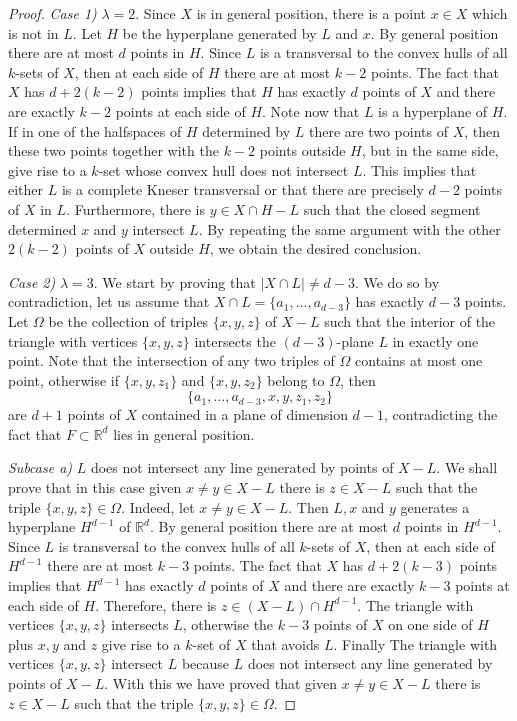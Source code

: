 \documentclass[11pt]{amsart}
\theoremstyle{plain}
\theoremstyle{definition}
\theoremstyle{remark}
\begin{document}
\begin{proof}
{\em Case 1)}  $\lambda=2$. Since $X$ is in general position, there is a point $x\in X$ which is not in $L$.  Let $H$ be the hyperplane generated by $L$ and $x$. By general position there are at most $d$ points in $H$. Since $L$ is a  transversal to the convex hulls of all $k$-sets of $X$, then at each side of $H$ there are at most $k-2$ points. The fact that $X$ has $d+2(k-2)$ points implies that $H$ has exactly $d$ points of $X$ and there are exactly $k-2$ points at each side of $H$.  Note now that $L$ is a hyperplane of $H$. If in one of the halfspaces of $H$ determined by $L$ there are two points of $X$, then these two points together with the $k-2$ points outside $H$, but in the same side, give rise to a $k$-set whose convex hull does not intersect $L$. This implies that either $L$ is a complete Kneser transversal or that  there are precisely $d-2$ points of $X$ in $L$. Furthermore,  there is  $y\in X\cap H-L$ such that the closed segment determined $x$ and $y$ intersect $L$.  By repeating the same argument with the other $2(k-2)$ points of $X$ outside $H$, we obtain the desired conclusion.
\medskip

{\em Case 2)} $\lambda=3$.  We start by proving that $\mid X\cap L\mid \not= d-3$. We do so by contradiction, let us assume that $X\cap L=\{a_1,\dots ,a_{d-3}\}$ has exactly $d-3$ points. Let $\Omega$ be the collection of triples $\{x,y,z \}$ of $X-L$ such that the interior of the triangle with vertices  $\{x,y,z \}$ intersects the $(d-3)$-plane $L$ in exactly one point.  Note that  the intersection of any two triples of $\Omega$ contains at most one point, otherwise if $\{x,y,z_1 \}$ and $\{x,y,z_2 \}$ belong to $\Omega$, then $$\{a_1,\dots ,a_{d-3}, x,y,z_1,z_2\}$$ are $d+1$ points of $X$ contained in a plane of dimension $d-1$, contradicting the fact that $F \subset \mathbb{R}^{d}$ lies in general position.
\medskip

{\em Subcase a)} $L$ does not intersect any line generated by points of $X-L$. We shall prove that in this case  given $x \not= y \in X-L$ there is $z\in X-L$ such that the triple $\{x,y,z \}\in\Omega$. Indeed, let $x \not= y \in X-L$.  Then $L, x$ and $y$ generates a hyperplane $H^{d-1}$ of $\mathbb{R}^{d}$.  By general position there are at most $d$ points in $H^{d-1}$. Since $L$ is transversal to the convex hulls of all $k$-sets of $X$, then at each side of $H^{d-1}$ there are at most $k-3$ points. The fact that $X$ has $d+2(k-3)$ points implies that $H^{d-1}$ has exactly $d$ points of $X$ and there are exactly $k-3$ points at each side of $H$. Therefore, there is $z\in (X-L)\cap H^{d-1}$. The triangle with vertices $\{x,y,z \}$ intersects $L$, otherwise the $k-3$ points of $X$ on one side of $H$ plus $x, y$ and $z$ give rise to a $k$-set of $X$ that avoids $L$. Finally The triangle with vertices $\{x,y,z \}$ intersect $L$ because $L$ does not intersect any line generated by points of $X-L$. With this we have proved that given $x \not= y \in X-L$ there is $z\in X-L$ such that the triple $\{x,y,z \}\in\Omega$.
\smallskip


\end{proof}
\end{document}
